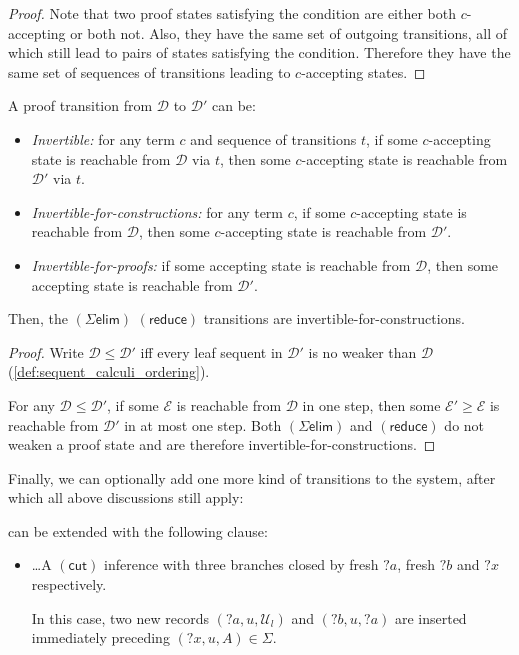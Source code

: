 \documentclass[twoside]{report}
\begin{document}
\begin{proof}
    Note that two proof states satisfying the condition are either both $c$-accepting or both not. Also, they have the same set of outgoing transitions, all of which still lead to pairs of states satisfying the condition. Therefore they have the same set of sequences of transitions leading to $c$-accepting states.
\end{proof}

\begin{proposition}
    \label{thm:tableau_transitions_invertibility}
    A proof transition from $\mathcal D$ to $\mathcal D'$ can be:
    \begin{itemize}
        \item \emph{Invertible:} for any term $c$ and sequence of transitions $t$, if some $c$-accepting state is reachable from $\mathcal D$ via $t$, then some $c$-accepting state is reachable from $\mathcal D'$ via $t$.

        \item \emph{Invertible-for-constructions:} for any term $c$, if some $c$-accepting state is reachable from $\mathcal D$, then some $c$-accepting state is reachable from $\mathcal D'$.

        \item \emph{Invertible-for-proofs:} if some accepting state is reachable from $\mathcal D$, then some accepting state is reachable from $\mathcal D'$.
    \end{itemize}
    Then, the $(\Sigma\mathsf{elim})$ $(\mathsf{reduce})$ transitions are invertible-for-constructions.
\end{proposition}

\begin{proof}
    Write $\mathcal D \leq \mathcal D'$ iff every leaf sequent in $\mathcal D'$ is no weaker than $\mathcal D$ (\cref{def:sequent_calculi_ordering}).

    For any $\mathcal D \leq \mathcal D'$, if some $\mathcal E$ is reachable from $\mathcal D$ in one step, then some $\mathcal E' \geq \mathcal E$ is reachable from $\mathcal D'$ in at most one step. Both $(\Sigma\mathsf{elim})$ and $(\mathsf{reduce})$ do not weaken a proof state and are therefore invertible-for-constructions.
\end{proof}

Finally, we can optionally add one more kind of transitions to the system, after which all above discussions still apply:

\begin{definition}
    \label{def:tableau_transitions_with_cut}
     can be extended with the following clause:
    \begin{itemize}
        \item \ldots A $(\mathsf{cut})$ inference with three branches closed by fresh ${?a}$, fresh ${?b}$ and ${?x}$ respectively.\par
              In this case, two new records $({?a}, u, \mathcal U_l)$ and $({?b}, u, {?a})$ are inserted immediately preceding $({?x}, u, A) \in \Sigma$.
    \end{itemize}
\end{definition}
\end{document}
